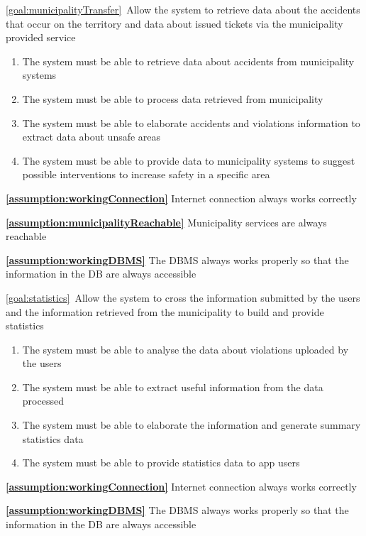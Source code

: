 \begin{description}
		\item \ref{goal:municipalityTransfer}\ Allow the system to retrieve data about the accidents that occur on the territory and data about issued tickets via the municipality provided service
			\begin{enumerate}[resume*]
   				\item The system must be able to retrieve data about accidents from municipality systems 
   				\item The system must be able to process data retrieved from municipality
   				\item The system must be able to elaborate accidents and violations information to extract data about unsafe areas
   				\item The system must be able to provide data to municipality systems to suggest possible interventions to increase safety in a specific area
  			\end{enumerate}
  			
  			\textbf{\ref{assumption:workingConnection}} Internet connection always works correctly
  			
			\textbf{\ref{assumption:municipalityReachable}} Municipality services are always reachable
			
  			\textbf{\ref{assumption:workingDBMS}} The DBMS always works properly so that the information in the DB are always accessible \newline
  			
  		\item \ref{goal:statistics}\ Allow the system to cross the information submitted by the users and the information retrieved from the municipality to build and provide statistics
  			\begin{enumerate}[resume*]
  				\item The system must be able to analyse the data about violations uploaded by the users
  				\item The system must be able to extract useful information from the data processed
  				\item The system must be able to elaborate the information and generate summary statistics data
  				\item The system must be able to provide statistics data to app users
  			\end{enumerate}
  			
  			\textbf{\ref{assumption:workingConnection}} Internet connection always works correctly
  			
			\textbf{\ref{assumption:workingDBMS}} The DBMS always works properly so that the information in the DB are always accessible \newline
			

\end{description}
